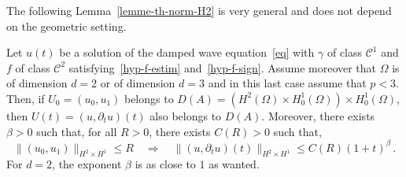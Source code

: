 \documentclass[AHL,Unicode,longabstracts]{cedram}
\newcommand{\Cc}{\mathcal{C}}
\begin{document}
The following Lemma~\ref{lemme-th-norm-H2} is very general and does not depend on the geometric setting.

\begin{lemm}\label{lemme-th-norm-H2}
Let $u(t)$ be a solution of the damped wave equation~\eqref{eq} with $\gamma$ of class $\Cc^1$ and $f$ of class $\Cc^2$ satisfying~\eqref{hyp-f-estim} and~\eqref{hyp-f-sign}. Assume moreover that $\Omega$ is of dimension $d=2$ or of dimension $d=3$ and in this last case assume that $p < 3$. Then, if $U_0=(u_0,u_1)$ belongs to $D(A)=(H^2(\Omega)\times H^1_0(\Omega))\times H^1_0(\Omega)$, then $U(t)=(u,\partial_t u)(t)$ also belongs to $D(A)$. Moreover, there exists $\beta>0$ such that, for all $R>0$, there exists $C(R)>0$ such that,
\[
\|(u_0,u_1)\|_{H^2\times H^1} \leq R\quad\Longrightarrow\quad\|(u,\partial_t
u)(t)\|_{H^2\times H^1} \leq C(R) (1+t)^\beta\,.
\]
For $d=2$, the exponent $\beta$ is as close to $1$ as wanted.
\end{lemm}
\end{document}
